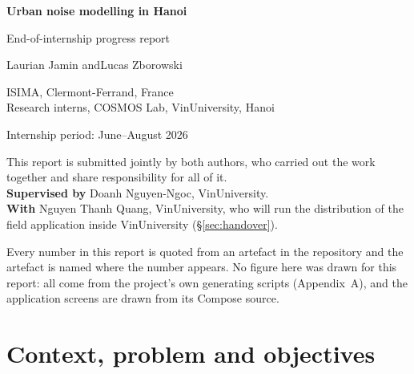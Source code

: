 \documentclass[11pt,a4paper]{article}
\begin{document}
\begin{titlepage}
 \centering
 \vspace*{2cm}
 {\Huge\bfseries Urban noise modelling in Hanoi\par}
 \vspace{.7em}
 {\Large\color{grayc} End-of-internship progress report\par}
 \vspace{2em}
 {\large Laurian Jamin \quad\textnormal{\color{grayc}and}\quad Lucas Zborowski\par}
 \vspace{.4em}
 {\normalsize ISIMA, Clermont-Ferrand, France\\
 Research interns, COSMOS Lab, VinUniversity, Hanoi\par}
 \vspace{1.6em}
 {\normalsize Internship period: June--August 2026\par}
 \vspace{2.2cm}

 \begin{minipage}{.88\textwidth}
 \small
 This report is submitted jointly by both authors, who carried out the work
 together and share responsibility for all of it.\\[.4em]
 \textbf{Supervised by} Doanh Nguyen-Ngoc, VinUniversity.\\
 \textbf{With} Nguyen Thanh Quang, VinUniversity, who will run the
 distribution of the field application inside VinUniversity
 (§\ref{sec:handover}).
 \end{minipage}

 \vfill
 \begin{minipage}{.88\textwidth}
 \footnotesize\color{grayc}
 Every number in this report is quoted from an artefact in the repository and
 the artefact is named where the number appears. No figure here was drawn for
 this report: all come from the project's own generating scripts
 (Appendix~A), and the application screens are drawn from its Compose source.
 \par\vspace{.6em}
 \end{minipage}
\end{titlepage}

\tableofcontents
\clearpage

\section{Context, problem and objectives}
\end{document}
